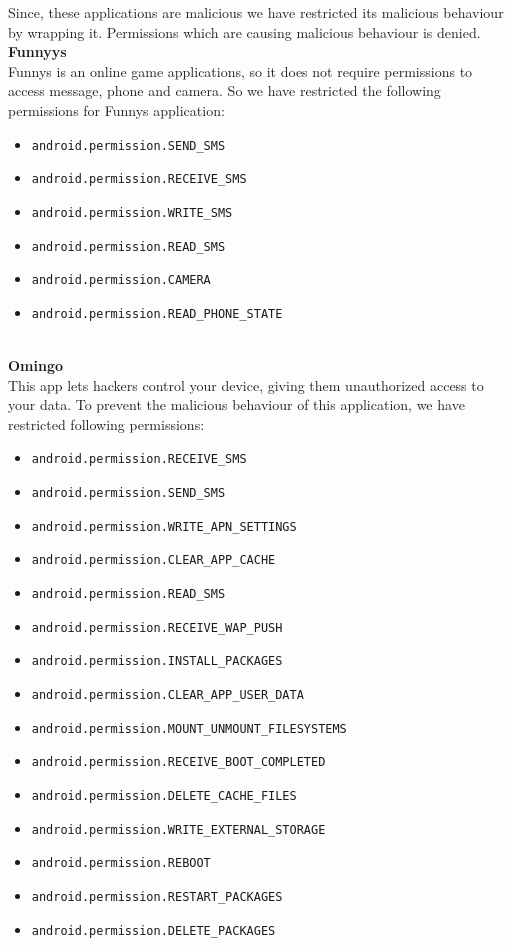 Since, these applications are malicious we have restricted its malicious behaviour by wrapping it. Permissions which are causing malicious behaviour is denied.\\
{\Large \textbf{Funnyys}}\\
Funnys is an online game applications, so it does not require permissions to access message, phone and camera. So we have restricted the following permissions for Funnys application:
\begin{itemize}
    \item \texttt{android.permission.SEND\_SMS}
\item \texttt{android.permission.RECEIVE\_SMS}
\item \texttt{android.permission.WRITE\_SMS}
\item \texttt{android.permission.READ\_SMS}
\item \texttt{android.permission.CAMERA}
\item \texttt{android.permission.READ\_PHONE\_STATE}
\end{itemize}\\
{\Large \textbf{Omingo}}\\
This app lets hackers control your device, giving them unauthorized access to your data. To prevent the malicious behaviour of this application, we have restricted following permissions:
\begin{itemize}
    \item \texttt{android.permission.RECEIVE\_SMS}
\item \texttt{android.permission.SEND\_SMS}
\item \texttt{android.permission.WRITE\_APN\_SETTINGS}
\item \texttt{android.permission.CLEAR\_APP\_CACHE}
\item \texttt{android.permission.READ\_SMS}
\item \texttt{android.permission.RECEIVE\_WAP\_PUSH}
\item \texttt{android.permission.INSTALL\_PACKAGES}
\item \texttt{android.permission.CLEAR\_APP\_USER\_DATA}
\item \texttt{android.permission.MOUNT\_UNMOUNT\_FILESYSTEMS}
\item \texttt{android.permission.RECEIVE\_BOOT\_COMPLETED}
\item \texttt{android.permission.DELETE\_CACHE\_FILES}
\item \texttt{android.permission.WRITE\_EXTERNAL\_STORAGE}
\item \texttt{android.permission.REBOOT}
\item \texttt{android.permission.RESTART\_PACKAGES}
\item \texttt{android.permission.DELETE\_PACKAGES}
\end{itemize}\\
